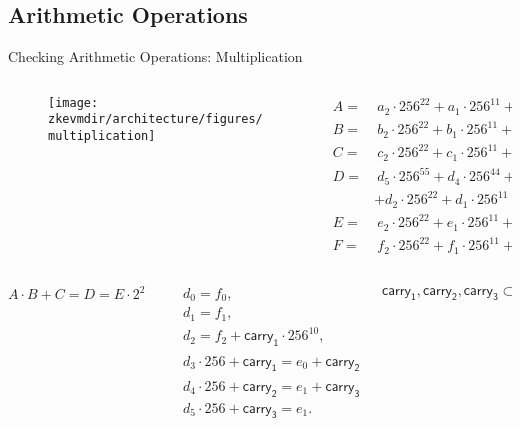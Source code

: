 \subsection{Arithmetic Operations}

\begin{frame}{Checking Arithmetic Operations: Multiplication}
\scriptsize
\begin{columns}
\begin{column}{0.5\textwidth}
\begin{figure}
	\texttt{[image: \\zkevmdir/architecture/figures/multiplication]}
\end{figure}
\end{column}
\begin{column}{0.5\textwidth}
\begin{align*}
A = &~a_2 \cdot 256^{22} + a_1 \cdot 256^{11} + a_0, \\
B = &~b_2 \cdot 256^{22} + b_1 \cdot 256^{11} + b_0, \\
C = &~c_2 \cdot 256^{22} + c_1 \cdot 256^{11} + c_0, \\
D = &~d_5 \cdot 256^{55} + d_4 \cdot 256^{44} + d_3 \cdot 256^{33} \\
&+ d_2 \cdot 256^{22} + d_1 \cdot 256^{11} + d_0, \\
E = &~e_2 \cdot 256^{22} + e_1 \cdot 256^{11} + e_0, \\
F = &~f_2 \cdot 256^{22} + f_1 \cdot 256^{11} + f_0,
\end{align*}
\end{column}
\end{columns}
\begin{columns}
\begin{column}{0.33\textwidth}
\[
A \cdot B + C = D = E \cdot 2^{256} + F
\]
\end{column}
\begin{column}{0.33\textwidth}
\begin{align*}
&d_0 = f_0, \\
&d_1 = f_1, \\
&d_2 = f_2 + \mathsf{carry_1} \cdot 256^{10}, \\
&d_3 \cdot 256 + \mathsf{carry_1} = e_0 + \mathsf{carry_2} \cdot 256^{11}, \\
&d_4 \cdot 256 + \mathsf{carry_2} = e_1 + \mathsf{carry_3} \cdot 256^{11}, \\
&d_5 \cdot 256 + \mathsf{carry_3} = e_1.
\end{align*}
\end{column}
\begin{column}{0.33\textwidth}
\[
\mathsf{carry_1}, \mathsf{carry_2}, \mathsf{carry_3} \subset \mathsf{byte}.
\]
\end{column}
\end{columns}
\end{frame}









